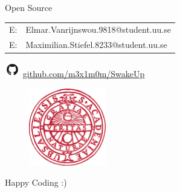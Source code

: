 \documentclass[apectratio=169]{beamer}
\begin{document}
  	\begin{frame}{Open Source}
        	\begin{center}
                \begin{table}[]
                        \begin{tabular}{ll}
                                E: & Elmar.Vanrijnswou.9818@student.uu.se \\
                                E: & Maximilian.Stiefel.8233@student.uu.se\\
                        \end{tabular}
                \end{table}
                \includegraphics[width=0.05\textwidth]{./fig/github} \hspace{0.1cm} \url{github.com/m3x1m0m/SwakeUp}\\
        	\end{center}
        	\begin{figure}
                	\includegraphics[width=0.3\textwidth]{./fig/logo}
        	\end{figure}
  	\end{frame}


  \begin{frame}[standout]
	Happy Coding :) 
  \end{frame}
\end{document}
